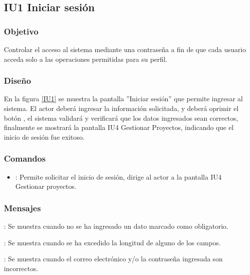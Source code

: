 \subsection{IU1 Iniciar sesión}

\subsubsection{Objetivo}
	Controlar el acceso al sistema mediante una contraseña a fin de que cada usuario acceda solo a las operaciones permitidas para su perfil.

\subsubsection{Diseño}
	En la figura \ref{IU1} se muestra la pantalla ''Iniciar sesión'' que permite ingresar al sistema. El actor deberá ingresar la información solicitada, y deberá oprimir el botón , el sistema validará y verificará que los datos ingresados sean correctos, finalmente se mostrará la pantalla IU4 Gestionar Proyectos, indicando que el inicio de sesión fue exitoso.

\label{IU1}
\subsubsection{Comandos}
\begin{itemize}
	\item {}: Permite solicitar el inicio de sesión, dirige al actor a la pantalla IU4 Gestionar proyectos.
\end{itemize}

\subsubsection{Mensajes}

\begin{Citemize}
	\item {}: Se muestra cuando no se ha ingresado un dato marcado como obligatorio.
	\item {}: Se muestra cuando se ha excedido la longitud de alguno de los campos.
	\item {}: Se muestra cuando el correo electrónico y/o la contraseña ingresada son incorrectos.
\end{Citemize}

